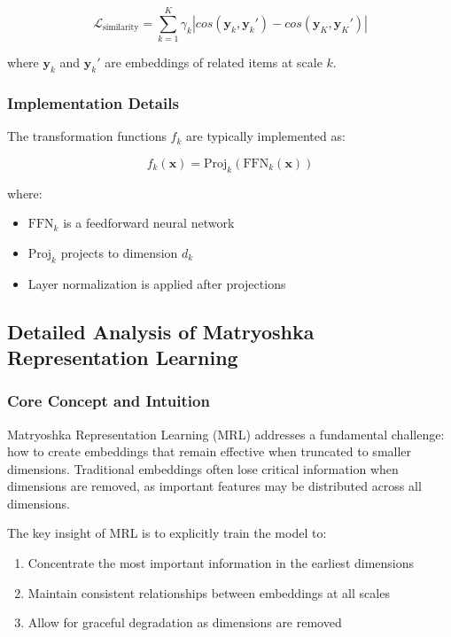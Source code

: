 \begin{equation}
    \mathcal{L}_{\text{similarity}} = \sum_{k=1}^K \gamma_k |cos(\mathbf{y}_k, \mathbf{y}_k') - cos(\mathbf{y}_K, \mathbf{y}_K')|
\end{equation}

where $\mathbf{y}_k$ and $\mathbf{y}_k'$ are embeddings of related items at scale $k$.

\subsubsection{Implementation Details}

The transformation functions $f_k$ are typically implemented as:

\begin{equation}
    f_k(\mathbf{x}) = \text{Proj}_k(\text{FFN}_k(\mathbf{x}))
\end{equation}

where:
\begin{itemize}
    \item $\text{FFN}_k$ is a feedforward neural network
    \item $\text{Proj}_k$ projects to dimension $d_k$
    \item Layer normalization is applied after projections
\end{itemize}

\subsection{Detailed Analysis of Matryoshka Representation Learning}

\subsubsection{Core Concept and Intuition}

Matryoshka Representation Learning (MRL) addresses a fundamental challenge: how to create embeddings that remain effective when truncated to smaller dimensions. Traditional embeddings often lose critical information when dimensions are removed, as important features may be distributed across all dimensions.

The key insight of MRL is to explicitly train the model to:
\begin{enumerate}
    \item Concentrate the most important information in the earliest dimensions
    \item Maintain consistent relationships between embeddings at all scales
    \item Allow for graceful degradation as dimensions are removed
\end{enumerate}

